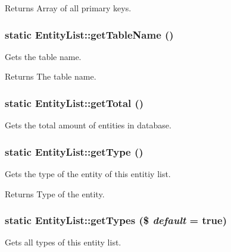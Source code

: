 \begin{DoxyReturn}{Returns}
Array of all primary keys. 
\end{DoxyReturn}
\hypertarget{classEntityList_a26d1917550bff1083b311ff888914f87}{
\subsubsection[{getTableName}]{\setlength{\rightskip}{0pt plus 5cm}static EntityList::getTableName ()}}
\label{classEntityList_a26d1917550bff1083b311ff888914f87}
Gets the table name.

\begin{DoxyReturn}{Returns}
The table name. 
\end{DoxyReturn}
\hypertarget{classEntityList_a949d4cec1f470a75357a79027266ff7b}{
\subsubsection[{getTotal}]{\setlength{\rightskip}{0pt plus 5cm}static EntityList::getTotal ()}}
\label{classEntityList_a949d4cec1f470a75357a79027266ff7b}
Gets the total amount of entities in database. \hypertarget{classEntityList_a2cdb7c626516c7aeac73f412d5cd09ce}{
\subsubsection[{getType}]{\setlength{\rightskip}{0pt plus 5cm}static EntityList::getType ()}}
\label{classEntityList_a2cdb7c626516c7aeac73f412d5cd09ce}
Gets the type of the entity of this entitiy list.

\begin{DoxyReturn}{Returns}
Type of the entity. 
\end{DoxyReturn}
\hypertarget{classEntityList_a6d880dc516f006975a349b1790d7020f}{
\subsubsection[{getTypes}]{\setlength{\rightskip}{0pt plus 5cm}static EntityList::getTypes (\$ {\em default} = {\ttfamily true})}}
\label{classEntityList_a6d880dc516f006975a349b1790d7020f}
Gets all types of this entity list.

